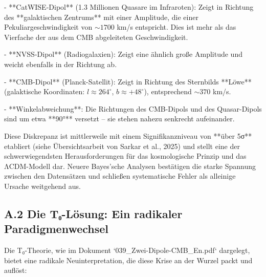 - **CatWISE-Dipol** (1.3 Millionen Quasare im Infraroten): Zeigt in Richtung des **galaktischen Zentrums** mit einer Amplitude, die einer Pekuliargeschwindigkeit von $\sim 1700$ km/s entspricht. Dies ist mehr als das Vierfache der aus dem CMB abgeleiteten Geschwindigkeit.

- **NVSS-Dipol** (Radiogalaxien): Zeigt eine ähnlich große Amplitude und weicht ebenfalls in der Richtung ab.

- **CMB-Dipol** (Planck-Satellit): Zeigt in Richtung des Sternbilds **Löwe** (galaktische Koordinaten: $l \approx 264^\circ$, $b \approx +48^\circ$), entsprechend $\sim 370$ km/s.

- **Winkelabweichung**: Die Richtungen des CMB-Dipols und des Quasar-Dipols sind um etwa **90°** versetzt – sie stehen nahezu senkrecht aufeinander.

Diese Diskrepanz ist mittlerweile mit einem Signifikanzniveau von **über 5σ** etabliert (siehe Übersichtsarbeit von Sarkar et al., 2025) und stellt eine der schwerwiegendsten Herausforderungen für das kosmologische Prinzip und das ΛCDM-Modell dar. Neuere Bayes'sche Analysen bestätigen die starke Spannung zwischen den Datensätzen und schließen systematische Fehler als alleinige Ursache weitgehend aus.

\subsection*{A.2 Die T₀-Lösung: Ein radikaler Paradigmenwechsel}

Die T₀-Theorie, wie im Dokument `039\_Zwei-Dipole-CMB\_En.pdf` dargelegt, bietet eine radikale Neuinterpretation, die diese Krise an der Wurzel packt und auflöst:

